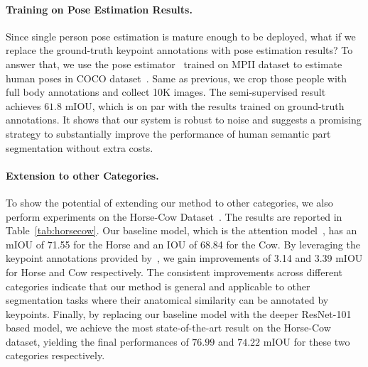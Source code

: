 \documentclass[10pt,twocolumn,letterpaper]{article}
\begin{document}
\paragraph{Training on Pose Estimation Results.}
Since single person pose estimation is mature enough to be deployed, what if we replace the ground-truth keypoint annotations with pose estimation results? To answer that, we use the pose estimator~\cite{fang2017rmpe} trained on MPII dataset to estimate human poses in COCO dataset~\cite{lin2014microsoft}. Same as previous, we crop those people with full body annotations and collect 10K images. The semi-supervised result achieves $\mathbf{61.8}$ mIOU, which is on par with the results trained on ground-truth annotations. It shows that our system is robust to noise and suggests a promising strategy to substantially improve the performance of human semantic part segmentation without extra costs.
\vspace{-4mm}
\paragraph{Extension to other Categories.}
To show the potential of extending our method to other categories, we also perform experiments on the Horse-Cow Dataset~\cite{wang2015semantic}. The results are reported in Table~\ref{tab:horsecow}. Our baseline model, which is the attention model~\cite{chen2016attention}, has an mIOU of 71.55 for the Horse and an IOU of 68.84 for the Cow. By leveraging the keypoint annotations provided by~\cite{PoseletsPAMI}, we gain improvements of 3.14 and 3.39 mIOU for Horse and Cow respectively. The consistent improvements across different categories indicate that our method is general and applicable to other segmentation tasks where their anatomical similarity can be annotated by keypoints. Finally, by replacing our baseline model with the deeper ResNet-101 based model, we achieve the most state-of-the-art result on the Horse-Cow dataset, yielding the final performances of $76.99$ and $74.22$ mIOU for these two categories respectively.
\end{document}
